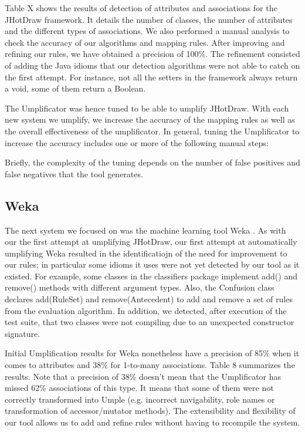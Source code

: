 Table X shows the results of detection of attributes and associations for the JHotDraw framework. It details the number of classes, the number of attributes and the different types of associations. We also performed a manual analysis to check the accuracy of our algorithms and mapping rules. After improving and refining our rules, we have obtained a precision of 100\%. The refinement consisted of adding the Java idioms that our detection algorithms were not able to catch on the first attempt. For instance, not all the setters in the framework always return a void, some of them return a Boolean.

The Umplificator was hence tuned to be able to umplify JHotDraw. With each new system we umplify, we increase the accuracy of the mapping rules as well as the overall effectiveness of the umplificator. In general, tuning the Umplificator to increase the accuracy includes one or more of the following manual steps:


Briefly, the complexity of the tuning depends on the number of false positives and false negatives that the tool generates.

\subsection{Weka}
 
The next system we focused on was the machine learning tool Weka \cite{Weka}. As with our the first attempt at umplifying JHotDraw, our first attempt at automatically umplifying Weka resulted in the identificatiojn of the need for improvement to our rules; in particular some idioms it uses were not yet detected by our tool as it existed. For example, some classes in the classifiers package implement add() and remove() methods with different argument types. Also, the Confusion class declares add(RuleSet) and remove(Antecedent) to add and remove a set of rules from the evaluation algorithm. In addition, we detected, after execution of the test suite, that two classes were not compiling due to an unexpected constructor signature.

Initial Umplification results for Weka nonetheless have a precision of 85\% when it comes to attributes and 38\% for 1-to-many associations. Table 8 summarizes the results. Note that a precision of 38\% doesn't mean that the Umplificator has missed 62\% associations of this type. It means that some of them were not correctly transformed into Umple (e.g. incorrect navigability, role names or transformation of accessor/mutator methods). The extensibility and flexibility of our tool allows us to add and refine rules without having to recompile the system.

